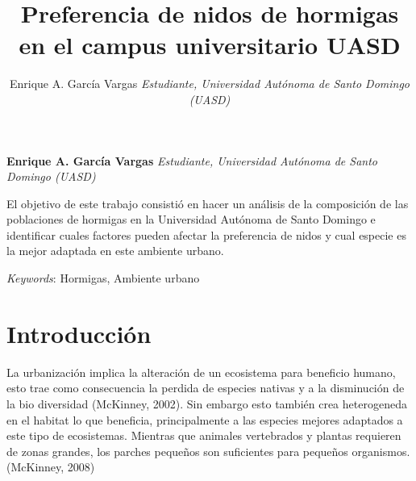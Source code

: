 \documentclass[11pt,]{article}
\title{\textbar{}Preferencia de nidos de hormigas en el campus universitario
UASD \textbar{} \textbar{}  }
\author{\Large Enrique A. García Vargas\vspace{0.05in} \newline\normalsize\emph{Estudiante, Universidad Autónoma de Santo Domingo (UASD)}  }
\date{}
\newcommand*{\authorfont}{\fontfamily{phv}\selectfont}
\renewenvironment{abstract}
 {{%
    \setlength{\leftmargin}{0mm}
    \setlength{\rightmargin}{\leftmargin}%
  }%
  \relax}
 {\endlist}
\begin{document}
	
%

{%
\setlength{\parindent}{0pt}
\thispagestyle{plain}
{\fontsize{18}{20}\selectfont\raggedright 
\maketitle  %

}

{
   \vskip 13.5pt\relax \normalsize\fontsize{11}{12} 
\textbf{\authorfont Enrique A. García Vargas} \hskip 15pt \emph{\small Estudiante, Universidad Autónoma de Santo Domingo (UASD)}   

}

}








\begin{abstract}

    \hbox{\vrule height .2pt width 39.14pc}

    \vskip 8.5pt %

\noindent El objetivo de este trabajo consistió en hacer un análisis de la
composición de las poblaciones de hormigas en la Universidad Autónoma de
Santo Domingo e identificar cuales factores pueden afectar la
preferencia de nidos y cual especie es la mejor adaptada en este
ambiente urbano.


\vskip 8.5pt \noindent \emph{Keywords}: Hormigas, Ambiente urbano \par

    \hbox{\vrule height .2pt width 39.14pc}



\end{abstract}


\vskip 6.5pt


\noindent  \section{Introducción}\label{introducciuxf3n}

La urbanización implica la alteración de un ecosistema para beneficio
humano, esto trae como consecuencia la perdida de especies nativas y a
la disminución de la bio diversidad (McKinney, 2002). Sin embargo esto
también crea heterogeneda en el habitat lo que beneficia, principalmente
a las especies mejores adaptados a este tipo de ecosistemas. Mientras
que animales vertebrados y plantas requieren de zonas grandes, los
parches pequeños son suficientes para pequeños organismos.(McKinney,
2008)
\end{document}
